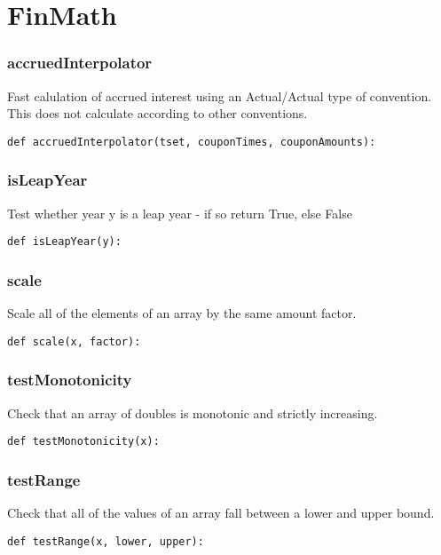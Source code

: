 \documentclass[twoside,11pt]{book}
\begin{document}
\newpage
\section{FinMath}

\subsubsection*{{\bf accruedInterpolator}}
Fast calulation of accrued interest using an Actual/Actual type of convention. This does not calculate according to other conventions.  

\begin{lstlisting}
def accruedInterpolator(tset, couponTimes, couponAmounts):
\end{lstlisting}

\subsubsection*{{\bf isLeapYear}}
Test whether year y is a leap year - if so return True, else False  

\begin{lstlisting}
def isLeapYear(y):
\end{lstlisting}

\subsubsection*{{\bf scale}}
Scale all of the elements of an array by the same amount factor.  

\begin{lstlisting}
def scale(x, factor):
\end{lstlisting}

\subsubsection*{{\bf testMonotonicity}}
Check that an array of doubles is monotonic and strictly increasing.  

\begin{lstlisting}
def testMonotonicity(x):
\end{lstlisting}

\subsubsection*{{\bf testRange}}
Check that all of the values of an array fall between a lower and upper bound.  

\begin{lstlisting}
def testRange(x, lower, upper):
\end{lstlisting}
\end{document}
